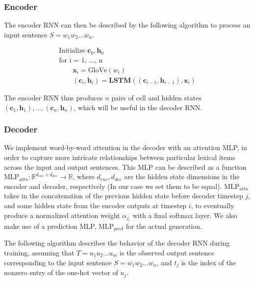 \documentclass[a4paper, 12pt]{article}
\theoremstyle{definition}
\begin{document}
\subsubsection{Encoder}

The encoder RNN can then be described by the following algorithm to process an input sentence $S = w_1w_2...w_n$.

\begin{gather}
\text{Initialize } \mathbf{c}_0, \mathbf{h}_0 \\
\text{for i = 1, ..., n } \\
	\qquad \mathbf{x}_i = \text{GloVe}(w_i)  \\
	\qquad (\mathbf{c}_{i}, \mathbf{h}_{i}) = \textbf{LSTM}((\mathbf{c}_{i-1}, \mathbf{h}_{i-1}), \mathbf{x}_{i}) 
\end{gather}

The encoder RNN thus produces $n$ pairs of cell and hidden states $(\mathbf{c}_1, \mathbf{h}_1), ..., (\mathbf{c}_n, \mathbf{h}_n)$, which will be useful in the decoder RNN. 

\subsubsection{Decoder}

We implement word-by-word attention in the decoder with an attention MLP, in order to capture more intricate relationships between particular lexical items across the input and output sentences. This MLP can be described as a function $\text{MLP}_{attn} : \mathbb{R}^{d_{enc} + d_{dec}} \to \mathbb{R}$, where $d_{enc}, d_{dec}$ are the hidden state dimensions in the encoder and decoder, respectively (In our case we set them to be equal). $\text{MLP}_{attn}$ takes in the concatenation of the previous hidden state before decoder timestep $j$, and some hidden state from the encoder outputs at timestep $i$, to eventually produce a normalized attention weight $\alpha_{j_{i}}$ with a final softmax layer. We also make use of a prediction MLP, $\text{MLP}_{pred}$ for the actual generation.

\bigskip

 The following algorithm describes the behavior of the decoder RNN during training, assuming that $T = u_1u_2...u_m$ is the observed output sentence corresponding to the input sentence $S = w_1w_2...w_n$, and $t_j$ is the index of the nonzero entry of the one-hot vector of $u_j$.
\end{document}
